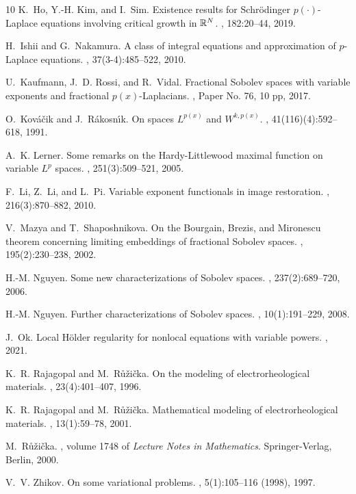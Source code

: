 \documentclass[11pt]{amsart}
\theoremstyle{plain}
\theoremstyle{definition}
\numberwithin{equation}{section}
\begin{document}
\begin{thebibliography}{10}
K.~Ho, Y.-H. Kim, and I.~Sim.
\newblock Existence results for {S}chr\"{o}dinger {$p(\cdot)$}-{L}aplace
  equations involving critical growth in {$\Bbb R^N$}.
, 182:20--44, 2019.

H.~Ishii and G.~Nakamura.
\newblock A class of integral equations and approximation of {$p$}-{L}aplace
  equations.
, 37(3-4):485--522,
  2010.

U.~Kaufmann, J.~D. Rossi, and R.~Vidal.
\newblock Fractional {S}obolev spaces with variable exponents and fractional
  {$p(x)$}-{L}aplacians.
, Paper No. 76, 10 pp,
  2017.

O.~Kov\'{a}\v{c}ik and J.~R\'{a}kosn\'{\i}k.
\newblock On spaces {$L^{p(x)}$} and {$W^{k,p(x)}$}.
, 41(116)(4):592--618, 1991.

A.~K. Lerner.
\newblock Some remarks on the {H}ardy-{L}ittlewood maximal function on variable
  {$L^p$} spaces.
, 251(3):509--521, 2005.

F.~Li, Z.~Li, and L.~Pi.
\newblock Variable exponent functionals in image restoration.
, 216(3):870--882, 2010.

V.~Mazya and T.~Shaposhnikova.
\newblock On the {B}ourgain, {B}rezis, and {M}ironescu theorem concerning
  limiting embeddings of fractional {S}obolev spaces.
, 195(2):230--238, 2002.

H.-M. Nguyen.
\newblock Some new characterizations of {S}obolev spaces.
, 237(2):689--720, 2006.

H.-M. Nguyen.
\newblock Further characterizations of {S}obolev spaces.
, 10(1):191--229, 2008.

J.~Ok.
\newblock Local {H}\"{o}lder regularity for nonlocal equations with
  variable powers.
, 2021.

K.~R. Rajagopal and M.~R{\r u}\v{z}i\v{c}ka.
\newblock On the modeling of electrorheological materials.
, 23(4):401--407, 1996.

K.~R. Rajagopal and M.~R{\r u}\v{z}i\v{c}ka.
\newblock Mathematical modeling of electrorheological materials.
, 13(1):59--78, 2001.

M.~R{\r u}\v{z}i\v{c}ka.
,
  volume 1748 of {\em Lecture Notes in Mathematics}.
\newblock Springer-Verlag, Berlin, 2000.

V.~V. Zhikov.
\newblock On some variational problems.
, 5(1):105--116 (1998), 1997.

\end{thebibliography}

%
%
\end{document}
